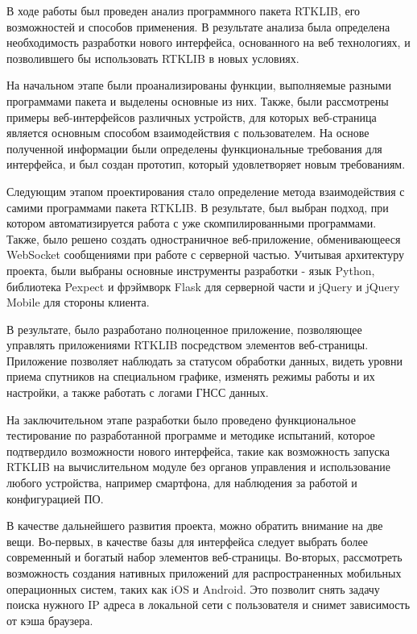 \conclusion

В ходе работы был проведен анализ программного пакета RTKLIB, его возможностей и способов применения. В результате анализа была определена необходимость разработки нового интерфейса, основанного на веб технологиях, и позволившего бы использовать RTKLIB в новых условиях.

На начальном этапе были проанализированы функции, выполняемые разными программами пакета и выделены основные из них. Также, были рассмотрены примеры веб-интерфейсов различных устройств, для которых веб-страница является основным способом взаимодействия с пользователем. На основе полученной информации были определены функциональные требования для интерфейса, и был создан прототип, который удовлетворяет новым требованиям.

Следующим этапом проектирования стало определение метода взаимодействия с самими программами пакета RTKLIB. В результате, был выбран подход, при котором автоматизируется работа с уже скомпилированными программами. Также, было решено создать одностраничное веб-приложение, обменивающееся WebSocket сообщениями при работе с серверной частью. Учитывая архитектуру проекта, были выбраны основные инструменты разработки - язык Python, библиотека Pexpect и фрэймворк Flask для серверной части и jQuery и jQuery Mobile для стороны клиента.

В результате, было разработано полноценное приложение, позволяющее управлять приложениями RTKLIB посредством элементов веб-страницы. Приложение позволяет наблюдать за статусом обработки данных, видеть уровни приема спутников на специальном графике, изменять режимы работы и их настройки, а также работать с логами ГНСС данных.

На заключительном этапе разработки было проведено функциональное тестирование по разработанной программе и методике испытаний, которое подтвердило возможности нового интерфейса, такие как возможность запуска RTKLIB на вычислительном модуле без органов управления и использование любого устройства, например смартфона, для наблюдения за работой и конфигурацией ПО.

В качестве дальнейшего развития проекта, можно обратить внимание на две вещи. Во-первых, в качестве базы для интерфейса следует выбрать более современный и богатый набор элементов веб-страницы. Во-вторых, рассмотреть возможность создания нативных приложений для распространенных мобильных операционных систем, таких как iOS и Android. Это позволит снять задачу поиска нужного IP адреса в локальной сети с пользователя и снимет зависимость от кэша браузера.
